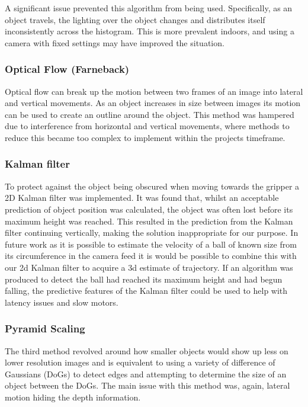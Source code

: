 \documentclass[conference]{IEEEtran}
\begin{document}
A significant issue prevented this algorithm from being used. Specifically, as an object travels, the lighting over the object changes and distributes itself inconsistently across the histogram. This is more prevalent indoors, and using a camera with fixed settings may have improved the situation.

\subsubsection{Optical Flow (Farneback)}
Optical flow can break up the motion between two frames of an image into lateral and vertical movements. As an object increases in size between images its motion can be used to create an outline around the object. This method was hampered due to interference from horizontal and vertical movements, where methods to reduce this became too complex to implement within the projects timeframe.

\subsubsection{Kalman filter}
To protect against the object being obscured when moving towards the gripper a 2D Kalman filter was implemented. It was found that, whilst an acceptable prediction of object position was calculated, the object was often lost before its maximum height was reached. This resulted in the prediction from the Kalman filter continuing vertically, making the solution inappropriate for our purpose. In future work as it is possible to estimate the velocity of a ball of known size from its circumference in the camera feed it is would be possible to combine this with our 2d Kalman filter to acquire a 3d estimate of trajectory. If an algorithm was produced to detect the ball had reached its maximum height and had begun falling, the predictive features of the Kalman filter could be used to help with latency issues and slow motors.

\subsubsection{Pyramid Scaling}
The third method revolved around how smaller objects would show up less on lower resolution images and is equivalent to using a variety of difference of Gaussians (DoGs) to detect edges and attempting to determine the size of an object between the DoGs. The main issue with this method was, again, lateral motion hiding the depth information.
\end{document}
